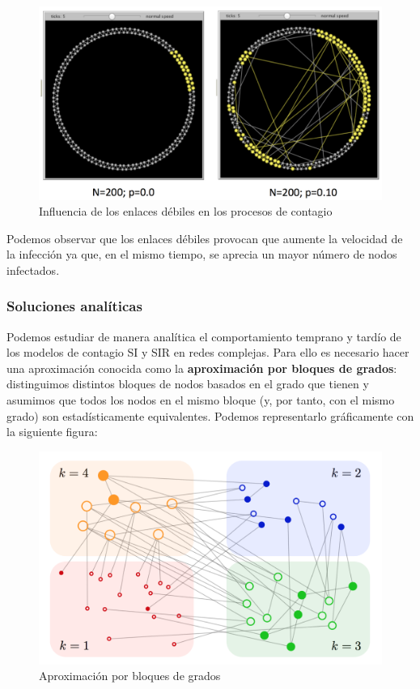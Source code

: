 \documentclass[]{article}
\begin{document}
\begin{figure}[htbp]
\centering
\includegraphics{../images/tema08/contagioSW.png}
\caption{Influencia de los enlaces débiles en los procesos de contagio}
\end{figure}

Podemos observar que los enlaces débiles provocan que aumente la
velocidad de la infección ya que, en el mismo tiempo, se aprecia un
mayor número de nodos infectados.

\subsubsection{Soluciones analíticas}\label{soluciones-analuxedticas}

Podemos estudiar de manera analítica el comportamiento temprano y tardío
de los modelos de contagio SI y SIR en redes complejas. Para ello es
necesario hacer una aproximación conocida como la \textbf{aproximación
por bloques de grados}: distinguimos distintos bloques de nodos basados
en el grado que tienen y asumimos que todos los nodos en el mismo bloque
(y, por tanto, con el mismo grado) son estadísticamente equivalentes.
Podemos representarlo gráficamente con la siguiente figura:

\begin{figure}[htbp]
\centering
\includegraphics{../images/tema08/bloqueGrado.png}
\caption{Aproximación por bloques de grados}
\end{figure}
\end{document}
